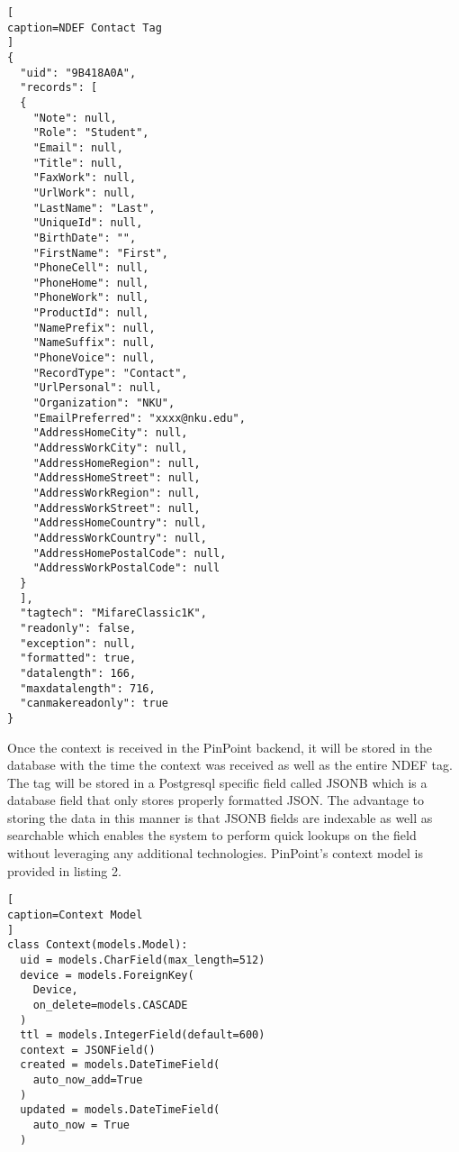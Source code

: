 \documentclass[11pt,journal]{IEEEtran}
\begin{document}
\begin{lstlisting}[
caption=NDEF Contact Tag
]
{
  "uid": "9B418A0A",
  "records": [
  {
    "Note": null,
	"Role": "Student",
	"Email": null,
	"Title": null,
	"FaxWork": null,
	"UrlWork": null,
	"LastName": "Last",
	"UniqueId": null,
	"BirthDate": "",
	"FirstName": "First",
	"PhoneCell": null,
	"PhoneHome": null,
	"PhoneWork": null,
	"ProductId": null,
	"NamePrefix": null,
	"NameSuffix": null,
	"PhoneVoice": null,
	"RecordType": "Contact",
	"UrlPersonal": null,
	"Organization": "NKU",
	"EmailPreferred": "xxxx@nku.edu",
	"AddressHomeCity": null,
	"AddressWorkCity": null,
	"AddressHomeRegion": null,
	"AddressHomeStreet": null,
	"AddressWorkRegion": null,
	"AddressWorkStreet": null,
	"AddressHomeCountry": null,
	"AddressWorkCountry": null,
	"AddressHomePostalCode": null,
	"AddressWorkPostalCode": null
  }
  ],
  "tagtech": "MifareClassic1K",
  "readonly": false,
  "exception": null,
  "formatted": true,
  "datalength": 166,
  "maxdatalength": 716,
  "canmakereadonly": true
}
\end{lstlisting}

Once the context is received in the PinPoint backend, it will be stored in the database with the time the context was received as well as the entire NDEF tag.  The tag will be stored in a Postgresql specific field called JSONB which is a database field that only stores properly formatted JSON.  The advantage to storing the data in this manner is that JSONB fields are indexable as well as searchable which enables the system to perform quick lookups on the field without leveraging any additional technologies. PinPoint's context model is provided in listing 2.

\begin{lstlisting}[
caption=Context Model
]
class Context(models.Model):
  uid = models.CharField(max_length=512)
  device = models.ForeignKey(
  	Device, 
  	on_delete=models.CASCADE
  )
  ttl = models.IntegerField(default=600)
  context = JSONField()
  created = models.DateTimeField(
  	auto_now_add=True
  )
  updated = models.DateTimeField(
  	auto_now = True
  )
\end{lstlisting}
\end{document}
